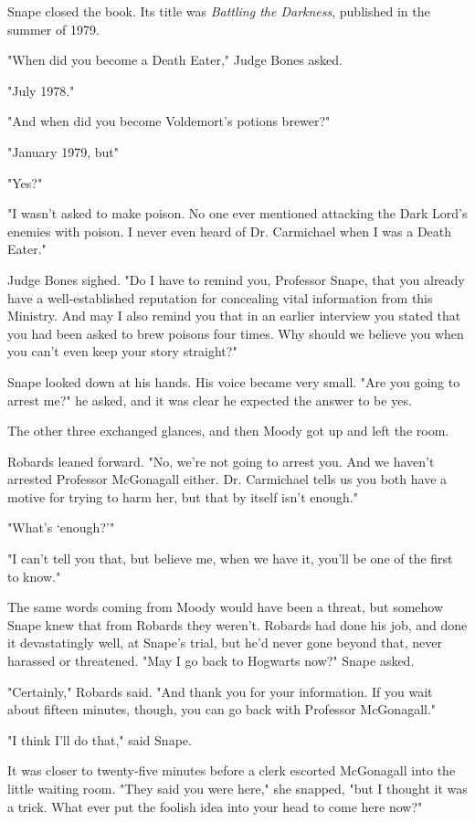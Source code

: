 Snape closed the book. Its title was \emph{Battling the Darkness}, published in the summer of 1979.

"When did you become a Death Eater," Judge Bones asked.

"July 1978."

"And when did you become Voldemort's potions brewer?"

"January 1979, but{\el}"

"Yes?"

"I wasn't asked to make poison. No one ever mentioned attacking the Dark Lord's enemies with poison. I never even heard of Dr. Carmichael when I was a Death Eater."

Judge Bones sighed. "Do I have to remind you, Professor Snape, that you already have a well-established reputation for concealing vital information from this Ministry. And may I also remind you that in an earlier interview you stated that you had been asked to brew poisons four times. Why should we believe you when you can't even keep your story straight?"

Snape looked down at his hands. His voice became very small. "Are you going to arrest me?" he asked, and it was clear he expected the answer to be yes.

The other three exchanged glances, and then Moody got up and left the room.

Robards leaned forward. "No, we're not going to arrest you. And we haven't arrested Professor McGonagall either. Dr. Carmichael tells us you both have a motive for trying to harm her, but that by itself isn't enough."

"What's `enough?'"

"I can't tell you that, but believe me, when we have it, you'll be one of the first to know."

The same words coming from Moody would have been a threat, but somehow Snape knew that from Robards they weren't. Robards had done his job, and done it devastatingly well, at Snape's trial, but he'd never gone beyond that, never harassed or threatened. "May I go back to Hogwarts now?" Snape asked.

"Certainly," Robards said. "And thank you for your information. If you wait about fifteen minutes, though, you can go back with Professor McGonagall."

"I think I'll do that," said Snape.

It was closer to twenty-five minutes before a clerk escorted McGonagall into the little waiting room. "They said you were here," she snapped, "but I thought it was a trick. What ever put the foolish idea into your head to come here now?"


